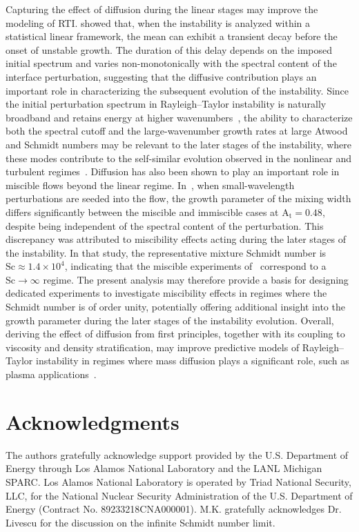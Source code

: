 \documentclass[11pt]{article}
\newcommand{\Atw}{\mathrm{A_t}}
\newcommand{\Sch}{\mathrm{Sc}}
\begin{document}
Capturing the effect of diffusion during the linear stages may improve the modeling of RTI. \citet{kola-israel-towne-2026} showed that, when the instability is analyzed within a statistical linear framework, the mean can exhibit a transient decay before the onset of unstable growth. The duration of this delay depends on the imposed initial spectrum and varies non-monotonically with the spectral content of the interface perturbation, suggesting that the diffusive contribution plays an important role in characterizing the subsequent evolution of the instability. Since the initial perturbation spectrum in Rayleigh--Taylor instability is naturally broadband and retains energy at higher wavenumbers~\citep{mueschke-andrews-schilling-2006}, the ability to characterize both the spectral cutoff and the large-wavenumber growth rates at large Atwood and Schmidt numbers may be relevant to the later stages of the instability, where these modes contribute to the self-similar evolution observed in the nonlinear and turbulent regimes~\citep{dimonte-et-al-2004,dimonte-2004}. Diffusion has also been shown to play an important role in miscible flows beyond the linear regime. In~\citet{roberts-jacobs-2016}, when small-wavelength perturbations are seeded into the flow, the growth parameter of the mixing width differs significantly between the miscible and immiscible cases at \(\Atw = 0.48\), despite being independent of the spectral content of the perturbation. This discrepancy was attributed to miscibility effects acting during the later stages of the instability. In that study, the representative mixture Schmidt number is \(\Sch \approx 1.4\times 10^{4}\), indicating that the miscible experiments of~\citet{roberts-jacobs-2016} correspond to a \(\Sch \to \infty\) regime. The present analysis may therefore provide a basis for designing dedicated experiments to investigate miscibility effects in regimes where the Schmidt number is of order unity, potentially offering additional insight into the growth parameter during the later stages of the instability evolution. Overall, deriving the effect of diffusion from first principles, together with its coupling to viscosity and density stratification, may improve predictive models of Rayleigh--Taylor instability in regimes where mass diffusion plays a significant role, such as plasma applications~\citep{vold-yin-albright-2021,keenan-sauppe-2023}.

\section*{Acknowledgments}
The authors gratefully acknowledge support provided by the U.S. Department of Energy through Los Alamos National Laboratory and the LANL Michigan SPARC. Los Alamos National Laboratory is operated by Triad National Security, LLC, for the National Nuclear Security Administration of the U.S. Department of Energy (Contract No. 89233218CNA000001). M.K. gratefully acknowledges Dr. Livescu for the discussion on the infinite Schmidt number limit.
\end{document}
